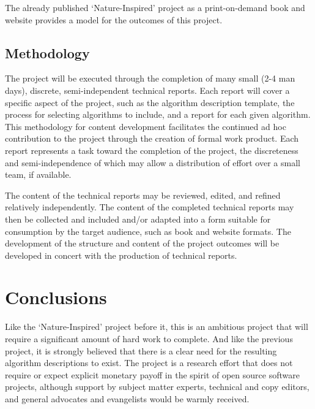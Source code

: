 \documentclass[a4paper, 11pt]{article}
\begin{document}
The already published `Nature-Inspired' project as a print-on-demand book and website provides a model for the outcomes of this project.

\subsection{Methodology}
The project will be executed through the completion of many small (2-4 man days), discrete, semi-independent technical reports. Each report will cover a specific aspect of the project, such as the algorithm description template, the process for selecting algorithms to include, and a report for each given algorithm. This methodology for content development facilitates the continued ad hoc contribution to the project through the creation of formal work product. Each report represents a task toward the completion of the project, the discreteness and semi-independence of which may allow a distribution of effort over a small team, if available.

The content of the technical reports may be reviewed, edited, and refined relatively independently. The content of the completed technical reports may then be collected and included and/or adapted into a form suitable for consumption by the target audience, such as book and website formats. The development of the structure and content of the project outcomes will be developed in concert with the production of technical reports.

\section{Conclusions}
\label{sec:conclusions}
Like the `Nature-Inspired' project before it, this is an ambitious project that will require a significant amount of hard work to complete. And like the previous project, it is strongly believed that there is a clear need for the resulting algorithm descriptions to exist. 
The project is a research effort that does not require or expect explicit monetary payoff in the spirit of open source software projects, although support by subject matter experts, technical and copy editors, and general advocates and evangelists would be warmly received. 



\end{document}
